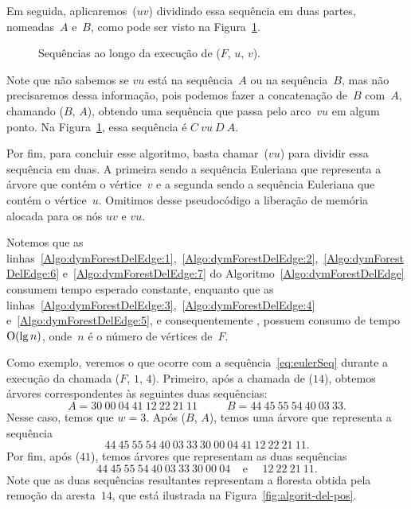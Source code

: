 Em seguida, aplicaremos~\treapSplit($uv$) dividindo essa sequência em duas partes, nomeadas~$A$ e~$B$, como pode ser visto na Figura~\ref{fig:algorit-cut-seqxy}.
\begin{figure}[htb]
\centering

\caption{Sequências ao longo da execução de \dymForestDelEdge($F$, $u$, $v$).}
\label{fig:algorit-cut-seqxy}
\end{figure}

Note que não sabemos se $vu$ está na sequência~$A$ ou na sequência~$B$, mas não precisaremos dessa informação, pois podemos fazer a concatenação de~$B$ com~$A$,
chamando \treapJoin($B$, $A$), obtendo uma sequência que passa pelo arco~$vu$ em algum ponto.
Na Figura~\ref{fig:algorit-cut-seqxy}, essa sequência é $C~vu~D~A$.

Por fim, para concluir esse algoritmo, basta chamar~\treapSplit($vu$) para dividir essa sequência em duas.
A primeira sendo a sequência Euleriana que representa a árvore que contém o vértice~$v$ e a segunda sendo a sequência Euleriana que contém o vértice~$u$.
Omitimos desse pseudocódigo a liberação de memória alocada para os nós $uv$ e $vu$.

Notemos que as linhas~\ref{Algo:dymForestDelEdge:1},~\ref{Algo:dymForestDelEdge:2},~\ref{Algo:dymForestDelEdge:6} e~\ref{Algo:dymForestDelEdge:7} do Algoritmo~\ref{Algo:dymForestDelEdge} consumem tempo esperado constante, enquanto que as linhas~\ref{Algo:dymForestDelEdge:3},~\ref{Algo:dymForestDelEdge:4} e~\ref{Algo:dymForestDelEdge:5}, e consequentemente \dymForestDelEdge{}, possuem consumo de tempo~$\mathrm{O}(\lg n)$, onde~$n$ é o número de vértices de~$F$.

Como exemplo, veremos o que ocorre com a sequência~\eqref{eq:eulerSeq} durante a execução da chamada \dymForestDelEdge($F$, $1$, $4$).
Primeiro, após a chamada de \treapSplit($14$), obtemos árvores correspondentes às seguintes duas sequências:
\begin{equation}
A = 30~00~04~41~12~22~21~11~~~~~~~~~~~~B = 44~45~55~54~40~03~33.\nonumber
\end{equation}
Nesse caso, temos que $w=3$. Após \treapJoin($B$, $A$), temos uma árvore que representa a sequência
\begin{equation}
 44~45~55~54~40~03~33~30~00~04~41~12~22~21~11.\nonumber
\end{equation}
Por fim, após \treapSplit($41$), temos árvores que representam as duas sequências
\begin{equation}
 44~45~55~54~40~03~33~30~00~04~~~~~\text{e}~~~~~~12~22~21~11.\label{eq:apos-remocao}
\end{equation}
Note que as duas sequências resultantes representam a floresta obtida pela remoção da aresta~$14$, que está ilustrada na Figura~\ref{fig:algorit-del-pos}.


